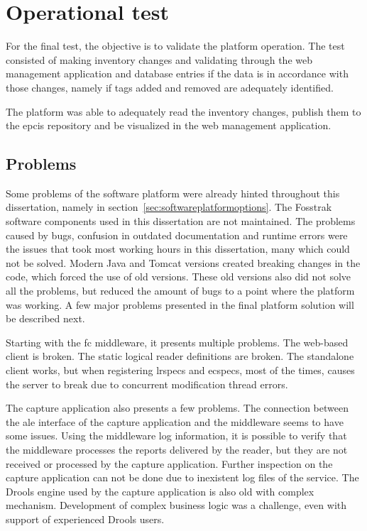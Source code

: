 \section{Operational test}

For the final test, the objective is to validate the platform operation.
The test consisted of making inventory changes and validating through the web management application and database entries if the data is in accordance with those changes, namely if tags added and removed are adequately identified.

The platform was able to adequately read the inventory changes, publish them to the \ac{epcis} repository and be visualized in the web management application.

\subsection{Problems}

Some problems of the software platform were already hinted throughout this dissertation, namely in section~\ref{sec:softwareplatformoptions}.
The Fosstrak software components used in this dissertation are not maintained. The problems caused by bugs, confusion in outdated documentation and runtime errors were the issues that took most working hours in this dissertation, many which could not be solved.
Modern Java and Tomcat versions created breaking changes in the code, which forced the use of old versions. 
These old versions also did not solve all the problems, but reduced the amount of bugs to a point where the platform was working. A few major problems presented in the final platform solution will be described next.

Starting with the \ac{fc} middleware, it presents multiple problems. 
The web-based client is broken. The static logical reader definitions are broken.
The standalone client works, but when registering \acp{lrspec} and \acp{ecspec}, most of the times, causes the server to break due to concurrent modification thread errors.

The capture application also presents a few problems.
The connection between the \ac{ale} interface of the capture application and the middleware seems to have some issues. Using the middleware log information, it is possible to verify that the middleware processes the reports delivered by the reader, but they are not received or processed by the capture application.
Further inspection on the capture application can not be done due to inexistent log files of the service.
The Drools engine used by the capture application is also old with complex mechanism. Development of complex business logic was a challenge, even with support of experienced Drools users.

